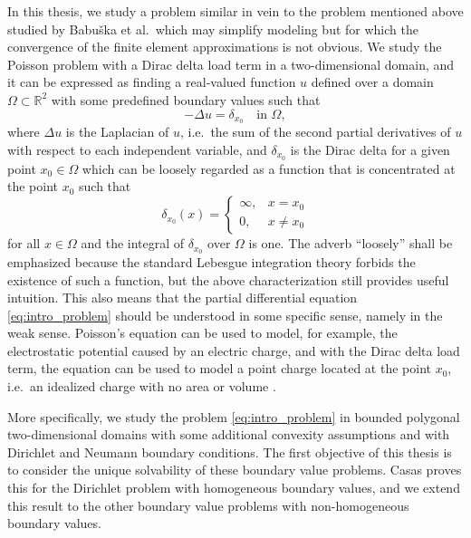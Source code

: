\documentclass[english, 12pt, a4paper, sci, utf8, a-2b, online]{aaltothesis}
\theoremstyle{definition}
\theoremstyle{plain}
\numberwithin{equation}{section}
\begin{document}
In this thesis, we study a problem similar in vein to the problem
mentioned above studied by Babu{\v s}ka et al.\
which may simplify modeling but for which
the convergence of the finite element approximations is not obvious.
We study the Poisson problem with a Dirac delta load term in a two-dimensional domain,
and it can be expressed as finding a real-valued function $u$ defined over
a domain $\Omega \subset \mathbb{R}^2$ with some predefined boundary values such that
\begin{equation}
    \label{eq:intro_problem}
    -\Delta u = \delta_{x_0} \quad \text{in } \Omega,
\end{equation}
where $\Delta u$ is the Laplacian of $u$,
i.e.\ the sum of the second partial derivatives of $u$
with respect to each independent variable,
and $\delta_{x_0}$ is the Dirac delta for a given point $x_0 \in \Omega$
which can be loosely regarded as a function that is concentrated
at the point $x_0$ such that
\begin{equation*}
    \delta_{x_0}(x) =
    \begin{cases}
        \infty, & x = x_0 \\
        0, & x \neq x_0
    \end{cases}
\end{equation*}
for all $x \in \Omega$ and the integral of $\delta_{x_0}$ over $\Omega$ is one.
The adverb ``loosely'' shall be emphasized because the standard Lebesgue integration
theory forbids the existence of such a function, but the above characterization
still provides useful intuition. This also means that the partial differential equation
\eqref{eq:intro_problem} should be
understood in some specific sense, namely in the weak sense.
Poisson's equation can be used to
model, for example, the electrostatic potential caused by an electric charge, and
with the Dirac delta load term, the equation can be used to model a point charge
located at the point $x_0$, i.e.\ an idealized charge with no area or volume \cite{wang2020}.

More specifically, we study the problem \eqref{eq:intro_problem}
in bounded polygonal two-dimensional domains
with some additional convexity assumptions
and with Dirichlet and Neumann boundary conditions.
The first objective of this thesis is to consider the unique solvability
of these boundary value problems.
Casas \cite{casas1985} proves this for the Dirichlet problem with
homogeneous boundary values, and we extend this result to the other boundary 
value problems with non-homogeneous boundary values.
\end{document}
